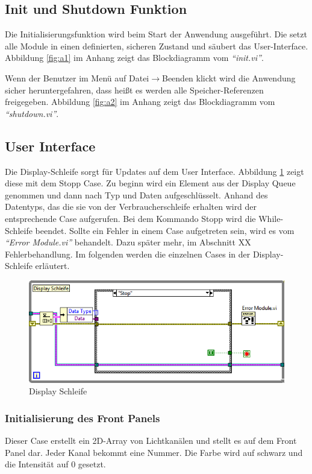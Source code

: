 \subsection{Init und Shutdown Funktion}	%
Die Initialisierungsfunktion wird beim Start der Anwendung ausgeführt. Die setzt alle Module in einen definierten, sicheren Zustand und säubert das User-Interface. Abbildung \ref{fig:a1} im Anhang zeigt das Blockdiagramm vom \textit{"`init.vi"'}.

Wenn der Benutzer im Menü auf Datei$\rightarrow$Beenden klickt wird die Anwendung sicher heruntergefahren, dass heißt es werden alle Speicher-Referenzen freigegeben. Abbildung \ref{fig:a2} im Anhang zeigt das Blockdiagramm vom \textit{"`shutdown.vi"'}.

\subsection{User Interface}
Die Display-Schleife sorgt für Updates auf dem User Interface.  Abbildung \ref{fig:disp} zeigt diese mit dem Stopp Case. Zu beginn wird ein Element aus der Display Queue genommen und dann nach Typ und Daten aufgeschlüsselt. Anhand des Datentyps, das die sie von der Verbraucherschleife erhalten wird der entsprechende Case aufgerufen. Bei dem Kommando Stopp wird die While-Schleife beendet. Sollte ein Fehler in einem Case aufgetreten sein, wird es vom \textit{"`Error Module.vi"'} behandelt. Dazu später mehr, im Abschnitt XX Fehlerbehandlung. Im folgenden werden die einzelnen Cases in der Display-Schleife erläutert.

	\begin{figure}[h!]
	\centering
		\includegraphics[width=\textwidth]{Pics/front-stop.png}
	\caption{Display Schleife}
	\label{fig:disp}
	\end{figure}


\subsubsection{Initialisierung des Front Panels}
Dieser Case erstellt ein 2D-Array von Lichtkanälen und stellt es auf dem Front Panel dar. Jeder Kanal bekommt eine Nummer. Die Farbe wird auf schwarz und die Intensität auf 0 gesetzt. 

